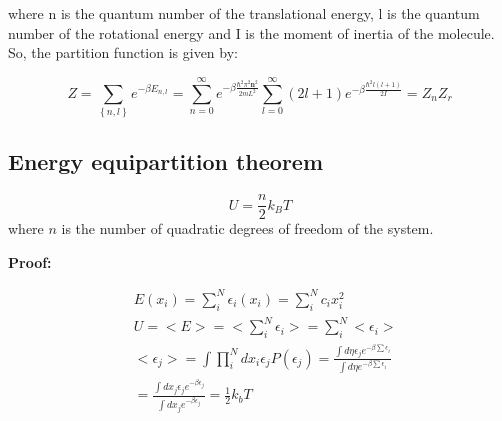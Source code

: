 \documentclass{article}
\begin{document}
where n is the quantum number of the translational energy, l is the quantum number of the rotational energy and I is the moment of inertia of the molecule.
So, the partition function is given by:

\begin{equation}
    Z=\sum_{\left\{ n,l \right\}} e^{-\beta E_{n,l}}=\sum_{n=0}^\infty e^{-\beta\frac{\hbar^2\pi^2 \textbf{n}^2}{2mL^2}}\sum_{l=0}^{\infty}(2l+1)e^{-\beta\frac{\hbar^2 l(l+1)}{2I}}=Z_nZ_r
\end{equation}



\subsection{Energy equipartition theorem}

\begin{tcolorbox}[colframe=gray!50, colback=gray!10, coltitle=black, title=Energy Equipartition Theorem]

    \begin{equation}
        U=\frac{n}{2}k_BT
    \end{equation}
    where \( n \) is the number of quadratic degrees of freedom of the system.

\end{tcolorbox}

\textbf{Proof:}

\begin{equation}
    \begin{aligned}
         & E({x_i})=\sum_{i}^{N}\epsilon_i(x_i)=\sum_{i}^{N}c_ix_i^2                                                                                                 \\
         & U=<E>=<\sum_{i}^{N}\epsilon_i>=\sum_{i}^{N}<\epsilon_i>                                                                                                   \\
         & <\epsilon_j>=\int \prod_{i}^{N}dx_i\epsilon_jP(\epsilon_j)= \frac{\int d\eta \epsilon_je^{-\beta \sum \epsilon_i}}{\int d\eta e^{-\beta \sum \epsilon_i}} \\
         & = \frac{\int dx_j\epsilon_je^{-\beta \epsilon_j}}{\int dx_je^{-\beta \epsilon_j}}=\frac{1}{2}k_bT
    \end{aligned}
\end{equation}

\newpage
\end{document}
